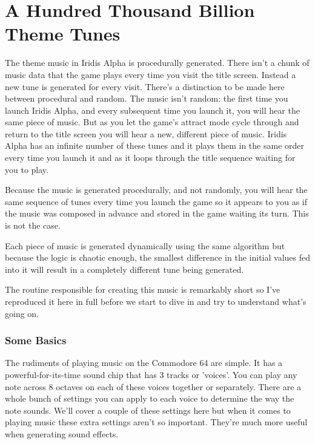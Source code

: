 \chapter{A Hundred Thousand Billion Theme Tunes} 

\lstset{style=6502Style}
The theme music in Iridis Alpha is procedurally generated. There isn't a chunk of music
data that the game plays every time you visit the title screen. Instead a new tune is generated
for every visit. There's a distinction to be made here between procedural and random. The 
music isn't random: the first time you launch Iridis Alpha, and every subsequent time you launch
it, you will hear the same piece of music. But as you let the game's attract mode cycle through and return
to the title screen you will hear a new, different piece of music. Iridis Alpha has an infinite
number of these tunes and it plays them in the same order every time you launch it and as it loops
through the title sequence waiting for you to play.

Because the music is generated procedurally, and not randomly, you will hear the same sequence
of tunes every time you launch the game so it appears to you as if the music was composed in 
advance and stored in the game waiting its turn. This is not the case.

Each piece of music is generated dynamically using the same algorithm but because the logic
is chaotic enough, the smallest difference in the initial values fed into it will result in 
a completely different tune being generated.

The routine responsible for creating this music is remarkably short so I've reproduced it here
in full before we start to dive in and try to understand what's going on.

%


\subsection{Some Basics}
The rudiments of playing music on the Commodore 64 are simple. It has a powerful-for-its-time
sound chip that has 3 tracks or 'voices'. You can play any note across 8 octaves on each of
these voices together or separately. There are a whole bunch of settings you can apply
to each voice to determine the way the note sounds. We'll cover a couple of these settings
here but when it comes to playing music these extra settings aren't so important. They're
much more useful when generating sound effects.

